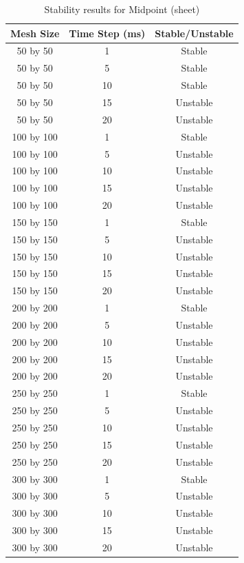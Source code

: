 \begin{table}[tp]
   \begin{minipage}{\textwidth}
      \begin{center}
         \begin{tabular}{|c|c|c|} \hline
           Mesh Size & Time Step (ms) & Stable/Unstable\\
           \hline
           50 by 50 & 1 & Stable\\ \hline
           50 by 50 & 5 & Stable\\ \hline
           50 by 50 & 10 & Stable\\ \hline
           50 by 50 & 15 & Unstable\\ \hline
           50 by 50 & 20 & Unstable\\ \hline
           100 by 100 & 1 & Stable\\ \hline
           100 by 100 & 5 & Unstable\\ \hline
           100 by 100 & 10 & Unstable\\ \hline
           100 by 100 & 15 & Unstable\\ \hline
           100 by 100 & 20 & Unstable\\ \hline           
           150 by 150 & 1 & Stable\\ \hline
           150 by 150 & 5 & Unstable\\ \hline
           150 by 150 & 10 & Unstable\\ \hline
           150 by 150 & 15 & Unstable\\ \hline
           150 by 150 & 20 & Unstable\\ \hline           
           200 by 200 & 1 & Stable\\ \hline
           200 by 200 & 5 & Unstable\\ \hline
           200 by 200 & 10 & Unstable\\ \hline
           200 by 200 & 15 & Unstable\\ \hline
           200 by 200 & 20 & Unstable\\ \hline           
           250 by 250 & 1 & Stable\\ \hline
           250 by 250 & 5 & Unstable\\ \hline
           250 by 250 & 10 & Unstable\\ \hline
           250 by 250 & 15 & Unstable\\ \hline
           250 by 250 & 20 & Unstable\\ \hline           
           300 by 300 & 1 & Stable\\ \hline
           300 by 300 & 5 & Unstable\\ \hline
           300 by 300 & 10 & Unstable\\ \hline
           300 by 300 & 15 & Unstable\\ \hline
           300 by 300 & 20 & Unstable\\ \hline
         \end{tabular}
      \end{center}
   \end{minipage}
   \caption{Stability results for Midpoint (sheet)}
   \label{tab:m stability sheet}
\end{table}

